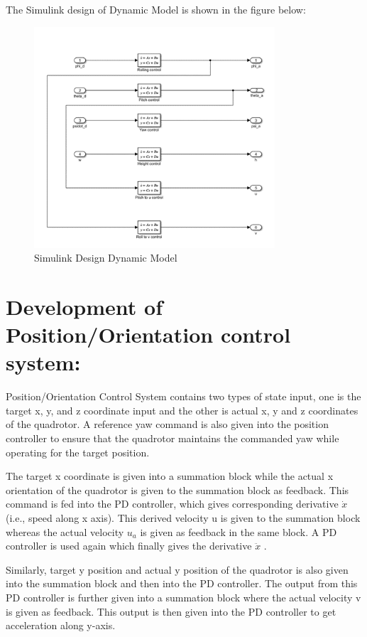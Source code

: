 The Simulink design of Dynamic Model is shown in the figure below:
\begin{figure}
	\centering
	\includegraphics[width=0.8\textwidth]{Images/position_control}
	\caption{Simulink Design Dynamic Model}
	\label{fig:pc}
\end{figure}

\section{Development of Position/Orientation control system:}

Position/Orientation Control System contains two types of state input, one is the target x, y, and z coordinate input and the other is actual x, y and z coordinates of the quadrotor. A reference yaw command is also given into the position controller to ensure that the quadrotor maintains the commanded yaw while operating for the target position.

The target x coordinate is given into a summation block while the actual x orientation of the quadrotor is given to the summation block as feedback. This command is fed into the PD controller, which gives corresponding derivative $\dot{x}$ (i.e., speed along x axis). This derived velocity u is given to the summation block whereas the actual velocity $ u_a $ is given as feedback in the same block. A PD controller is used again which finally gives the derivative $\ddot{x}$ . 

Similarly, target y position and actual y position of the quadrotor is also given into the summation block and then into the PD controller. The output from this PD controller is further given into a summation block where the actual velocity v is given as feedback. This output is then given into the PD controller to get acceleration along y-axis. 

